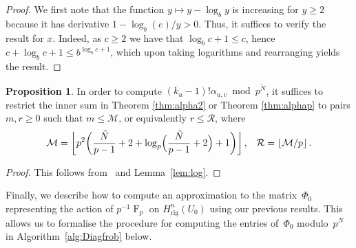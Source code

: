 \documentclass[a4paper,11pt]{article}
\numberwithin{equation}{section}
\providecommand{\floor}[1]{\left\lfloor#1\right\rfloor}   %
\DeclareMathOperator{\Frob}{F}           %
\providecommand{\Hrig}{H_{\text{rig}}}  %
\theoremstyle{definition}
\newtheorem{prop}[thm]{Proposition}
\begin{document}
\begin{proof}
We first note that the function $y \mapsto y - \log_b y$ is increasing 
for $y \geq 2$ because it has derivative $1 - \log_b(e)/y > 0$.  Thus, it 
suffices to verify the result for $x$.  Indeed, as $c \geq 2$ we have 
that $\log_b c + 1 \leq c$, hence $c + \log_b c + 1 \leq b^{\log_b c + 1}$,
which upon taking logarithms and rearranging yields the result.
\end{proof}

\begin{prop} \label{prop:MR}
In order to compute $(k_u-1)!\alpha_{u,v} \bmod p^{\tilde{N}}$, it 
suffices to restrict the inner sum in Theorem \ref{thm:alpha2} or 
Theorem \ref{thm:alphap} to pairs $m,r \geq 0$ such that $m \leq \mathcal{M}$, or 
equivalently $r \leq \mathcal{R}$, where 
\begin{equation*}
\mathcal{M} = \floor{ p^2 \biggl( \frac{\tilde{N}}{p-1} +2 
            + \log_p\Bigl(\frac{\tilde{N}}{p-1} + 2\Bigr) + 1 \biggr)}, \; \; \; \mathcal{R}=\floor{\mathcal{M}/p}.
\end{equation*}
\end{prop}

\begin{proof}
This follows from~\citep[\S 6.2]{Lauder2004b} and Lemma~\ref{lem:log}.
\end{proof}

Finally, we describe how to compute an approximation to the matrix~$\Phi_0$ 
representing the action of $p^{-1} \Frob_p$ on $\Hrig^{n}(U_0)$ using our 
previous results. This allows us to formalise the procedure for computing 
the entries of~$\Phi_0$ modulo~$p^N$ in Algorithm~\ref{alg:Diagfrob} 
below.
\end{document}
